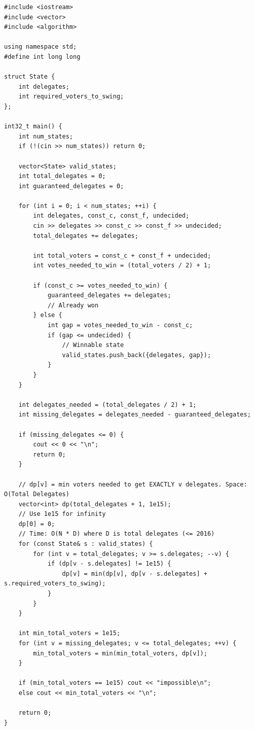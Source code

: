 \begin{lstlisting}
#include <iostream>
#include <vector>
#include <algorithm>

using namespace std;
#define int long long

struct State {
    int delegates;
    int required_voters_to_swing;
};

int32_t main() {
    int num_states;
    if (!(cin >> num_states)) return 0;
    
    vector<State> valid_states;
    int total_delegates = 0;
    int guaranteed_delegates = 0;
    
    for (int i = 0; i < num_states; ++i) {
        int delegates, const_c, const_f, undecided;
        cin >> delegates >> const_c >> const_f >> undecided;
        total_delegates += delegates;
        
        int total_voters = const_c + const_f + undecided;
        int votes_needed_to_win = (total_voters / 2) + 1;
        
        if (const_c >= votes_needed_to_win) {
            guaranteed_delegates += delegates;
            // Already won
        } else {
            int gap = votes_needed_to_win - const_c;
            if (gap <= undecided) {
                // Winnable state
                valid_states.push_back({delegates, gap});
            }
        }
    }
    
    int delegates_needed = (total_delegates / 2) + 1;
    int missing_delegates = delegates_needed - guaranteed_delegates;
    
    if (missing_delegates <= 0) {
        cout << 0 << "\n";
        return 0;
    }
    
    // dp[v] = min voters needed to get EXACTLY v delegates. Space: O(Total Delegates)
    vector<int> dp(total_delegates + 1, 1e15);
    // Use 1e15 for infinity
    dp[0] = 0;
    // Time: O(N * D) where D is total delegates (<= 2016)
    for (const State& s : valid_states) {
        for (int v = total_delegates; v >= s.delegates; --v) {
            if (dp[v - s.delegates] != 1e15) {
                dp[v] = min(dp[v], dp[v - s.delegates] + s.required_voters_to_swing);
            }
        }
    }
    
    int min_total_voters = 1e15;
    for (int v = missing_delegates; v <= total_delegates; ++v) {
        min_total_voters = min(min_total_voters, dp[v]);
    }
    
    if (min_total_voters == 1e15) cout << "impossible\n";
    else cout << min_total_voters << "\n";
    
    return 0;
}
\end{lstlisting}


